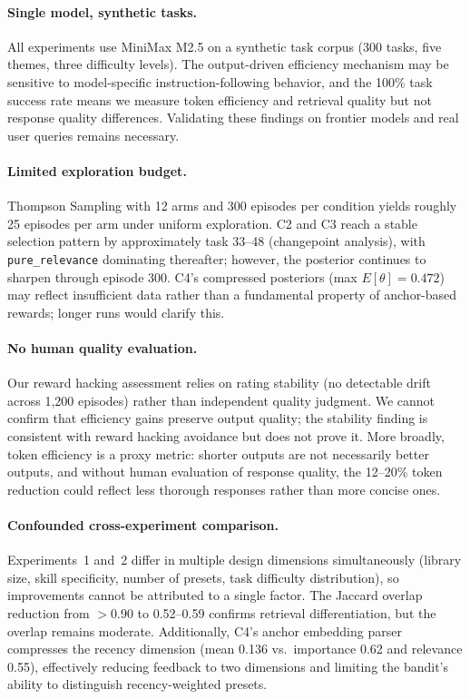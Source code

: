 
\paragraph{Single model, synthetic tasks.}
All experiments use MiniMax M2.5 on a synthetic task corpus (300 tasks, five themes, three difficulty levels).
The output-driven efficiency mechanism may be sensitive to model-specific instruction-following behavior, and the 100\% task success rate means we measure token efficiency and retrieval quality but not response quality differences.
Validating these findings on frontier models and real user queries remains necessary.

\paragraph{Limited exploration budget.}
Thompson Sampling with 12 arms and 300 episodes per condition yields roughly 25 episodes per arm under uniform exploration.
C2 and C3 reach a stable selection pattern by approximately task 33--48 (changepoint analysis), with \texttt{pure\_relevance} dominating thereafter; however, the posterior continues to sharpen through episode 300.
C4's compressed posteriors (max $E[\theta]{=}0.472$) may reflect insufficient data rather than a fundamental property of anchor-based rewards; longer runs would clarify this.

\paragraph{No human quality evaluation.}
Our reward hacking assessment relies on rating stability (no detectable drift across 1{,}200 episodes) rather than independent quality judgment.
We cannot confirm that efficiency gains preserve output quality; the stability finding is consistent with reward hacking avoidance but does not prove it.
More broadly, token efficiency is a proxy metric: shorter outputs are not necessarily better outputs, and without human evaluation of response quality, the 12--20\% token reduction could reflect less thorough responses rather than more concise ones.

\paragraph{Confounded cross-experiment comparison.}
Experiments~1 and~2 differ in multiple design dimensions simultaneously (library size, skill specificity, number of presets, task difficulty distribution), so improvements cannot be attributed to a single factor.
The Jaccard overlap reduction from ${>}$0.90 to 0.52--0.59 confirms retrieval differentiation, but the overlap remains moderate.
Additionally, C4's anchor embedding parser compresses the recency dimension (mean 0.136 vs.\ importance 0.62 and relevance 0.55), effectively reducing feedback to two dimensions and limiting the bandit's ability to distinguish recency-weighted presets.

